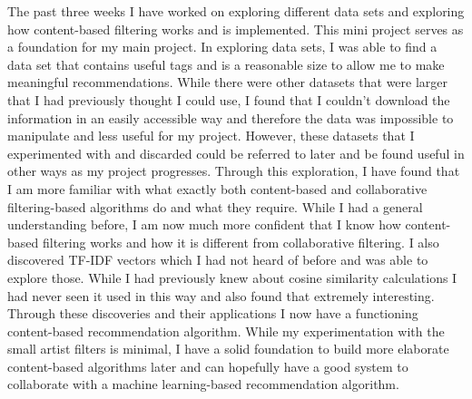 \documentclass[10pt,twocolumn]{article}
\begin{document}
The past three weeks I have worked on exploring different data sets and exploring how content-based filtering works and is implemented. This mini project serves as a foundation for my main project. In exploring data sets, I was able to find a data set that contains useful tags and is a reasonable size to allow me to make meaningful recommendations. While there were other datasets that were larger that I had previously thought I could use, I found that I couldn't download the information in an easily accessible way and therefore the data was impossible to manipulate and less useful for my project. However, these datasets that I experimented with and discarded could be referred to later and be found useful in other ways as my project progresses. Through this exploration, I have found that I am more familiar with what exactly both content-based and collaborative filtering-based algorithms do and what they require. While I had a general understanding before, I am now much more confident that I know how content-based filtering works and how it is different from collaborative filtering. I also discovered TF-IDF vectors which I had not heard of before and was able to explore those. While I had previously knew about cosine similarity calculations I had never seen it used in this way and also found that extremely interesting. Through these discoveries and their applications I now have a functioning content-based recommendation algorithm. While my experimentation with the small artist filters is minimal, I have a solid foundation to build more elaborate content-based algorithms later and can hopefully have a good system to collaborate with a machine learning-based recommendation algorithm.\\
\end{document}
